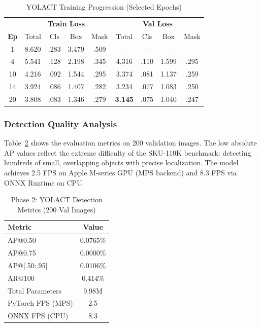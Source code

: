 \documentclass[conference]{IEEEtran}
\begin{document}
\begin{table}[t]
  \centering
  \caption{YOLACT Training Progression (Selected Epochs)}
  \label{tab:training}
  \begin{tabular}{c|cccc|cccc}
    \toprule
    & \multicolumn{4}{c|}{\textbf{Train Loss}} & \multicolumn{4}{c}{\textbf{Val Loss}} \\
    \textbf{Ep} & Total & Cls & Box & Mask & Total & Cls & Box & Mask \\
    \midrule
    1  & 8.620 & .283 & 3.479 & .509 & -- & -- & -- & -- \\
    4  & 5.541 & .128 & 2.198 & .345 & 4.316 & .110 & 1.599 & .295 \\
    10 & 4.216 & .092 & 1.544 & .295 & 3.374 & .081 & 1.137 & .259 \\
    14 & 3.924 & .086 & 1.407 & .282 & 3.234 & .077 & 1.083 & .250 \\
    20 & 3.808 & .083 & 1.346 & .279 & \textbf{3.145} & .075 & 1.040 & .247 \\
    \bottomrule
  \end{tabular}
\end{table}

\subsubsection{Detection Quality Analysis}

Table~\ref{tab:eval_metrics} shows the evaluation metrics on 200 validation
images. The low absolute AP values reflect the extreme difficulty of the
SKU-110K benchmark: detecting hundreds of small, overlapping objects with
precise localization. The model achieves 2.5 FPS on Apple M-series GPU
(MPS backend) and 8.3 FPS via ONNX Runtime on CPU.

\begin{table}[t]
  \centering
  \caption{Phase 2: YOLACT Detection Metrics (200 Val Images)}
  \label{tab:eval_metrics}
  \begin{tabular}{lc}
    \toprule
    \textbf{Metric} & \textbf{Value} \\
    \midrule
    AP@0.50              & 0.0765\% \\
    AP@0.75              & 0.0000\% \\
    AP@[.50:.95]         & 0.0106\% \\
    AR@100               & 0.414\% \\
    Total Parameters     & 9.98M \\
    PyTorch FPS (MPS)    & 2.5 \\
    ONNX FPS (CPU)       & 8.3 \\
    \bottomrule
  \end{tabular}
\end{table}
\end{document}
